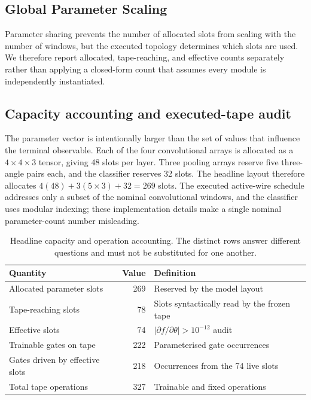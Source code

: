 \documentclass[conference]{IEEEtran}
\begin{document}
\subsection{Global Parameter Scaling}
Parameter sharing prevents the number of allocated slots from scaling with the number of windows, but the executed topology determines which slots are used. We therefore report allocated, tape-reaching, and effective counts separately rather than applying a closed-form count that assumes every module is independently instantiated.

\subsection{Capacity accounting and executed-tape audit}
The parameter vector is intentionally larger than the set of values that
influence the terminal observable. Each of the four convolutional arrays is
allocated as a $4\times4\times3$ tensor, giving 48 slots per layer. Three
pooling arrays reserve five three-angle pairs each, and the classifier reserves
32 slots. The headline layout therefore allocates
$4(48)+3(5\times3)+32=269$ slots. The executed active-wire schedule addresses
only a subset of the nominal convolutional windows, and the classifier uses
modular indexing; these implementation details make a single nominal
parameter-count number misleading.

\begin{table}[!t]
\caption{Headline capacity and operation accounting. The distinct rows answer different questions and must not be substituted for one another.}
\label{tab:capacity}
\centering
\small
\begin{tabular}{@{}p{}r p{}@{}}
\toprule
\textbf{Quantity} & \textbf{Value} & \textbf{Definition} \\
\midrule
Allocated parameter slots & 269 & Reserved by the model layout \\
Tape-reaching slots & 78 & Slots syntactically read by the frozen tape \\
Effective slots & 74 & $|\partial f/\partial\theta|>10^{-12}$ audit \\
Trainable gates on tape & 222 & Parameterised gate occurrences \\
Gates driven by effective slots & 218 & Occurrences from the 74 live slots \\
Total tape operations & 327 & Trainable and fixed operations \\
\bottomrule
\end{tabular}
\end{table}
\end{document}
